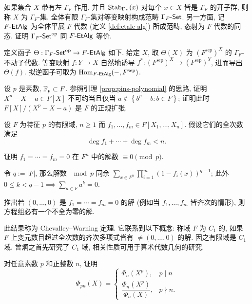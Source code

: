 \begin{Exercises}
	\item 如果集合 $X$ 带有左 $\Gamma_F$-作用, 并且 $\operatorname{Stab}_{\Gamma_F}(x)$ 对每个 $x \in X$ 皆是 $\Gamma_F$ 的开子群, 则称 $X$ 为 $\Gamma_F$-集. 全体有限 $\Gamma_F$-集对等变映射构成范畴 $\Gamma_F\text{-}\mathsf{Set}$. 另一方面, 记 $F\text{-}\mathsf{EtAlg}$ 为全体平展 $F$-代数 (定义 \ref{def:etale-alg}) 所成范畴, 态射为 $F$-代数的同态. 证明 $\Gamma_F\text{-}\mathsf{Set}^\text{op}$ 同 $F\text{-}\mathsf{EtAlg}$ 等价.
	\begin{hint}
		定义函子 $\Theta: \Gamma_F\text{-}\mathsf{Set}^\text{op} \to F\text{-}\mathsf{EtAlg}$ 如下. 给定 $X$, 取 $\Theta(X)$ 为 $(F^\text{sep})^X$ 的 $\Gamma_F$-不动子代数. 等变映射 $f: Y \to X$ 自然地诱导 $f^*: (F^\text{sep})^X \to (F^\text{sep})^Y$, 进而导出 $\Theta(f)$. 拟逆函子可取为 $\operatorname{Hom}_{F\text{-}\mathsf{EtAlg}}(-, F^\text{sep})$.
	\end{hint}
	\item 设 $p$ 是素数, $\mathbb{F}_p \subset F$. 参照引理 \ref{prop:pins-polynomial} 的思路, 证明 $X^p - X - a \in F[X]$ 不可约当且仅当 $a \notin \left\{b^p -b : b \in F\right\}$; 证明此时 $F[X]/(X^p-X-a)$ 是 $F$ 的正规扩张.
	\item 设 $F$ 为特征 $p$ 的有限域, $n \geq 1$ 而 $f_1, \ldots, f_m \in F[X_1, \ldots, X_n]$. 假设它们的全次数满足
		\[ \deg f_1 + \cdots + \deg f_m < n. \]
		\begin{compactenum}[(i)]
			\item 证明 $f_1 = \cdots = f_m = 0$ 在 $F^n$ 中的解数 $\equiv 0 \pmod p$.
			\begin{hint}
				令 $q := |F|$, 那么解数 $\mod p$ 同余 $\sum_{x \in F^n} \prod_{i=1}^m \left( 1 - f_i(x) \right)^{q-1}$; 此外 $0 \leq k < q-1 \implies \sum_{a \in F} a^k = 0$.
			\end{hint}
			\item 推出若 $(0, \ldots, 0)$ 是 $f_1 = \cdots = f_m = 0$ 的解 (例如当 $f_1, \ldots, f_m$ 皆齐次的情形), 则方程组必有一个不全为零的解.
		\end{compactenum}
		此结果称为 Chevalley--Warning 定理. 它联系到以下概念: 称域 $F$ 为 $C_1$ 的, 如果 $F$ 上变元数目超过全次数的齐次多项式皆有 $\neq (0, \ldots, 0)$ 的解. 因之有限域是 $C_1$ 域. 曾炯之首先研究了 $C_1$ 域, 相关性质可用于算术代数几何的研究.
	\item 对任意素数 $p$ 和正整数 $n$, 证明
		\[ \Phi_{pn}(X) = \begin{cases} \Phi_n(X^p), & p \mid n \\ \dfrac{\Phi_n(X^p)}{\Phi_n(X)}, & p \nmid n. \end{cases} \]

\end{Exercises}
